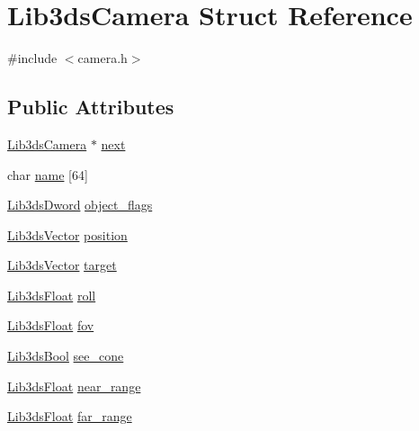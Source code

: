 \hypertarget{struct_lib3ds_camera}{\section{Lib3ds\-Camera Struct Reference}
\label{struct_lib3ds_camera}
}


{\ttfamily \#include $<$camera.\-h$>$}

\subsection*{Public Attributes}
\begin{DoxyCompactItemize}
\item 
\hyperlink{struct_lib3ds_camera}{Lib3ds\-Camera} $\ast$ \hyperlink{struct_lib3ds_camera_a7a97ca5f129c077a526f0eaee34c6d8e}{next}
\item 
char \hyperlink{struct_lib3ds_camera_a72643a8a401382a4f11e4801ea9a9b35}{name} \mbox{[}64\mbox{]}
\item 
\hyperlink{types_8h_a299c9663303144c562f6bd92c2f273d3}{Lib3ds\-Dword} \hyperlink{struct_lib3ds_camera_a6c25abb4ea0c132b826cb66bacc8e756}{object\-\_\-flags}
\item 
\hyperlink{group__vector_ga6ac1c3b3ef15381ebf6baf264d658dcf}{Lib3ds\-Vector} \hyperlink{struct_lib3ds_camera_aff0af1c668e44ec404f87377d7ec81ee}{position}
\item 
\hyperlink{group__vector_ga6ac1c3b3ef15381ebf6baf264d658dcf}{Lib3ds\-Vector} \hyperlink{struct_lib3ds_camera_ab3d73f084d9cc27a578cc4a232b699d7}{target}
\item 
\hyperlink{types_8h_ab18e70f51f9a53c9dee8d930c8e1a7bf}{Lib3ds\-Float} \hyperlink{struct_lib3ds_camera_af3e8475e88c05aa83830537640a10653}{roll}
\item 
\hyperlink{types_8h_ab18e70f51f9a53c9dee8d930c8e1a7bf}{Lib3ds\-Float} \hyperlink{struct_lib3ds_camera_a39eda62ee0768a1ae5c73c505677d904}{fov}
\item 
\hyperlink{types_8h_a89dd7398a9ebbbf28011f8c32df67ad3}{Lib3ds\-Bool} \hyperlink{struct_lib3ds_camera_a09c05096cbd33f106869ca339e843f22}{see\-\_\-cone}
\item 
\hyperlink{types_8h_ab18e70f51f9a53c9dee8d930c8e1a7bf}{Lib3ds\-Float} \hyperlink{struct_lib3ds_camera_af0b2a0e7a0b316b88f00e4bdb859e9ad}{near\-\_\-range}
\item 
\hyperlink{types_8h_ab18e70f51f9a53c9dee8d930c8e1a7bf}{Lib3ds\-Float} \hyperlink{struct_lib3ds_camera_a77f7c7aa50cd42ba53995147c57a37b0}{far\-\_\-range}
\end{DoxyCompactItemize}



